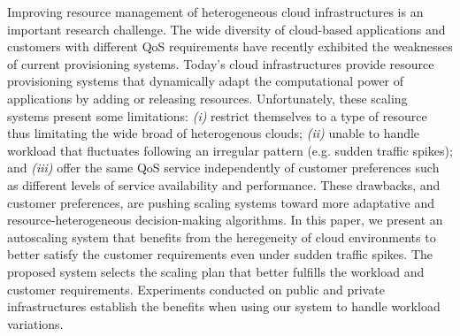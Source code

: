 Improving resource management of heterogeneous cloud infrastructures is an important research challenge. The wide diversity of cloud-based applications and customers with different QoS requirements have recently exhibited the weaknesses of current provisioning systems. Today's cloud infrastructures provide resource provisioning systems that dynamically adapt the computational power of applications by adding or releasing resources. Unfortunately, these scaling systems present some limitations: \emph{(i)} restrict themselves to a type of resource thus limitating the wide broad of heterogenous clouds; \emph{(ii)} unable to handle workload that fluctuates following an irregular pattern (e.g. sudden traffic spikes); and \emph{(iii)} offer the same QoS service independently of customer preferences such as different levels of service availability and performance. These drawbacks, and customer preferences, are pushing scaling systems toward more adaptative and resource-heterogeneous decision-making algorithms. In this paper, we present an autoscaling system that benefits from the heregeneity of cloud environments to better satisfy the customer requirements even under sudden traffic spikes. The proposed system selects the scaling plan that better fulfills the workload and customer requirements. Experiments conducted on public and private infrastructures establish the benefits when using our system to handle workload variations.





